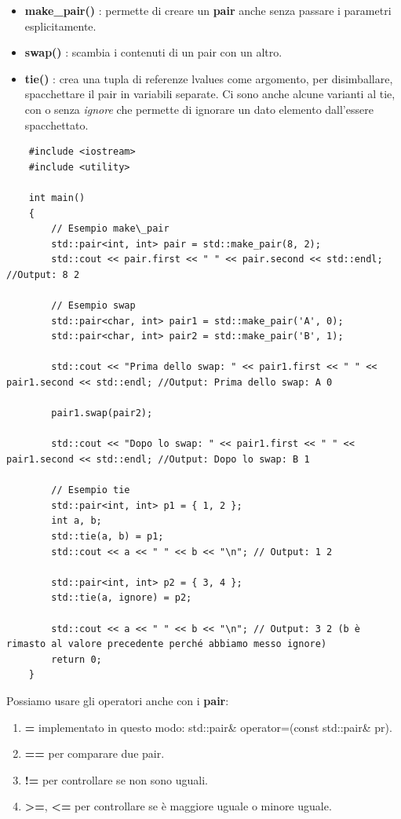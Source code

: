 \begin{itemize}
	\item \textsf{\small \textbf{make\_pair()} : permette di creare un \textbf{pair} anche senza passare i parametri esplicitamente.}
	\item \textsf{\small \textbf{swap()} : scambia i contenuti di un pair con un altro.}
	\item \textsf{\small \textbf{tie()} : crea una tupla di referenze lvalues come argomento, per disimballare, spacchettare il pair in variabili separate. Ci sono anche alcune varianti al tie, con o senza \emph{ignore} che permette di ignorare un dato elemento dall'essere spacchettato.}
\end{itemize}

\begin{lstlisting}
	#include <iostream>
	#include <utility>
	
	int main()
	{
		// Esempio make\_pair
		std::pair<int, int> pair = std::make_pair(8, 2);
		std::cout << pair.first << " " << pair.second << std::endl; //Output: 8 2
		
		// Esempio swap
		std::pair<char, int> pair1 = std::make_pair('A', 0);
		std::pair<char, int> pair2 = std::make_pair('B', 1);
		
		std::cout << "Prima dello swap: " << pair1.first << " " << pair1.second << std::endl; //Output: Prima dello swap: A 0
		
		pair1.swap(pair2);
		
		std::cout << "Dopo lo swap: " << pair1.first << " " << pair1.second << std::endl; //Output: Dopo lo swap: B 1
		
		// Esempio tie
		std::pair<int, int> p1 = { 1, 2 };
		int a, b;
		std::tie(a, b) = p1;
		std::cout << a << " " << b << "\n"; // Output: 1 2
		
		std::pair<int, int> p2 = { 3, 4 };
		std::tie(a, ignore) = p2;
		
		std::cout << a << " " << b << "\n"; // Output: 3 2 (b è rimasto al valore precedente perché abbiamo messo ignore)
		return 0;
	}
\end{lstlisting}

\textsf{\small Possiamo usare gli operatori anche con i \textbf{pair}: } \\

\begin{enumerate}
	\item \textsf{\small \textbf{=} implementato in questo modo: std::pair\& operator=(const std::pair\& pr).}
	\item \textsf{\small \textbf{==} per comparare due pair.}
	\item \textsf{\small \textbf{!=} per controllare se non sono uguali.}
	\item \textsf{\small \textbf{>=}, \textbf{<=} per controllare se è maggiore uguale o minore uguale.}
\end{enumerate}

